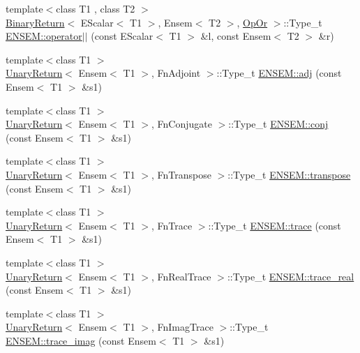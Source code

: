 \begin{DoxyCompactItemize}
\item 
{\footnotesize template$<$class T1 , class T2 $>$ }\\\mbox{\hyperlink{structBinaryReturn}{Binary\+Return}}$<$ E\+Scalar$<$ T1 $>$, Ensem$<$ T2 $>$, \mbox{\hyperlink{structOpOr}{Op\+Or}} $>$\+::Type\+\_\+t \mbox{\hyperlink{group__eensem_ga433f0b529c387d8299dd5c8eb5a9b3b0}{E\+N\+S\+E\+M\+::operator$\vert$$\vert$}} (const E\+Scalar$<$ T1 $>$ \&l, const Ensem$<$ T2 $>$ \&r)
\item 
{\footnotesize template$<$class T1 $>$ }\\\mbox{\hyperlink{structUnaryReturn}{Unary\+Return}}$<$ Ensem$<$ T1 $>$, Fn\+Adjoint $>$\+::Type\+\_\+t \mbox{\hyperlink{group__eensem_ga3c4b288659953aefecfc3a19bb11f326}{E\+N\+S\+E\+M\+::adj}} (const Ensem$<$ T1 $>$ \&s1)
\item 
{\footnotesize template$<$class T1 $>$ }\\\mbox{\hyperlink{structUnaryReturn}{Unary\+Return}}$<$ Ensem$<$ T1 $>$, Fn\+Conjugate $>$\+::Type\+\_\+t \mbox{\hyperlink{group__eensem_ga539331970eb8111bc1c56f049612dce8}{E\+N\+S\+E\+M\+::conj}} (const Ensem$<$ T1 $>$ \&s1)
\item 
{\footnotesize template$<$class T1 $>$ }\\\mbox{\hyperlink{structUnaryReturn}{Unary\+Return}}$<$ Ensem$<$ T1 $>$, Fn\+Transpose $>$\+::Type\+\_\+t \mbox{\hyperlink{group__eensem_gae77f21b6732b95bacf62ceb754c5ac17}{E\+N\+S\+E\+M\+::transpose}} (const Ensem$<$ T1 $>$ \&s1)
\item 
{\footnotesize template$<$class T1 $>$ }\\\mbox{\hyperlink{structUnaryReturn}{Unary\+Return}}$<$ Ensem$<$ T1 $>$, Fn\+Trace $>$\+::Type\+\_\+t \mbox{\hyperlink{group__eensem_ga11991a607d48e08d8be636503c1f5d20}{E\+N\+S\+E\+M\+::trace}} (const Ensem$<$ T1 $>$ \&s1)
\item 
{\footnotesize template$<$class T1 $>$ }\\\mbox{\hyperlink{structUnaryReturn}{Unary\+Return}}$<$ Ensem$<$ T1 $>$, Fn\+Real\+Trace $>$\+::Type\+\_\+t \mbox{\hyperlink{group__eensem_gad19d894f22555d78d30d2e186300fb11}{E\+N\+S\+E\+M\+::trace\+\_\+real}} (const Ensem$<$ T1 $>$ \&s1)
\item 
{\footnotesize template$<$class T1 $>$ }\\\mbox{\hyperlink{structUnaryReturn}{Unary\+Return}}$<$ Ensem$<$ T1 $>$, Fn\+Imag\+Trace $>$\+::Type\+\_\+t \mbox{\hyperlink{group__eensem_ga26802b2d0529b6b46a86cf2a04647476}{E\+N\+S\+E\+M\+::trace\+\_\+imag}} (const Ensem$<$ T1 $>$ \&s1)

\end{DoxyCompactItemize}
